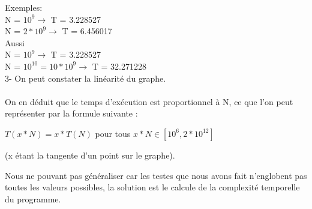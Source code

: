 \documentclass[•]{article}
\begin{document}
\color{blue}
Exemples:
\color{black} 
\\
N = $10^{9} \rightarrow $  T = 3.228527
\\
N = $2*10^{9} \rightarrow $  T =  6.456017
\\

Aussi
\\
N = $10^{9} \rightarrow $  T = 3.228527
\\
N = $10^{10} = 10*10^{9} \rightarrow $  T =  32.271228
\\

3- On peut constater la linéarité du graphe. 
\\
\\
On en déduit que le temps d'exécution est proportionnel à N, ce que l'on peut représenter par la formule suivante
: 
\begin{center}

	$T(x*N) = x*T(N)$ pour tous $ x*N \in [10^6,2*10^{12} ] $	
	

(x étant la tangente d'un point sur le graphe).
\end{center}

Nous ne pouvant pas généraliser car les testes que nous avons fait n'englobent pas toutes les valeurs possibles, 
	la solution est le calcule de la complexité temporelle du programme.
\end{document}
